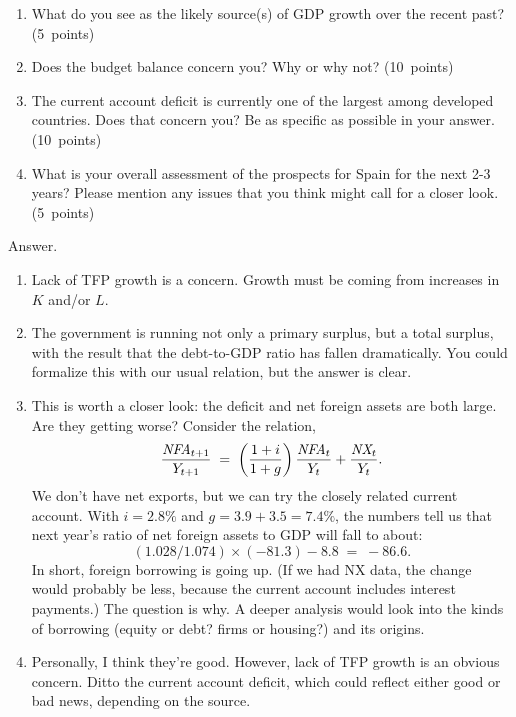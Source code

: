 \documentclass[letterpaper,12pt]{article}
\begin{document}
\begin{enumerate}
\begin{enumerate}

\item What do you see as the likely source(s) of GDP growth 
over the recent past?  
(5~points)

\item Does the budget balance concern you?  
Why or why not?  (10~points)

\item The current account deficit is currently one of the largest 
among developed countries.
Does that concern you?  Be as specific as possible in your answer. 
(10~points)

\item What is your overall assessment of the prospects for Spain
for the next 2-3 years?  
Please mention any issues that you think might call for a closer look. (5~points)

\end{enumerate}

Answer.
\begin{enumerate}
\item Lack of TFP growth is a concern.  
Growth must be coming from increases in $K$ and/or $L$.  
\item The government is running not only a primary surplus, 
but a total surplus, with the result that 
the debt-to-GDP ratio has fallen dramatically.  
You could formalize this with our usual relation, 
but the answer is clear.  
\item This is worth a closer look:  the deficit and net foreign assets
are both large.  
Are they getting worse?  
Consider the relation, 
\[
    \frac{\mbox{\em NFA}_{t+1}}{Y_{t+1}} \;=\; \left( \frac{1+i}{1+g} \right)
     \frac{\mbox{\em NFA}_{t}}{Y_{t}} 
     + \frac{\mbox{\em NX}_{t}}{Y_{t}} .
\]
We don't have net exports, but we can try the closely related current account.
With $ i = 2.8\%$ and $ g = 3.9 + 3.5 = 7.4\%$, 
the numbers tell us that next year's ratio of net foreign 
assets to GDP will fall to about:
\[
    (1.028/1.074) \times (-81.3) - 8.8 \;=\; -86.6 .
\]
In short, foreign borrowing is going up. 
(If we had NX data, the change would probably be less, because 
the current account includes interest payments.) 
The question is why. 
A deeper analysis would look into the kinds of borrowing 
(equity or debt?  firms or housing?) and its origins.  

\item Personally, I think they're good.  
However, lack of TFP growth is an obvious concern.  
Ditto the current account deficit, 
which could reflect either good or bad news, 
depending on the source. 


\end{enumerate}
\end{enumerate}
\end{document}
